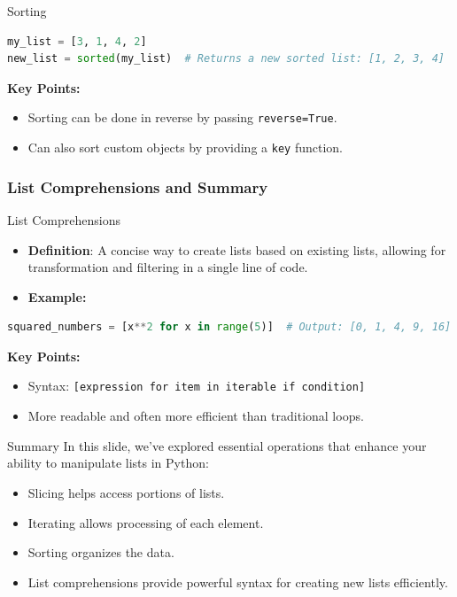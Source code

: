 \documentclass{beamer}
\begin{document}
\begin{frame}[fragile]
\begin{block}{Sorting}
        \begin{lstlisting}[language=Python]
my_list = [3, 1, 4, 2]
new_list = sorted(my_list)  # Returns a new sorted list: [1, 2, 3, 4]
        \end{lstlisting}

        \textbf{Key Points:}
        \begin{itemize}
            \item Sorting can be done in reverse by passing \texttt{reverse=True}.
            \item Can also sort custom objects by providing a \texttt{key} function.
        \end{itemize}
    \end{block}
\end{frame}

\begin{frame}[fragile]
    \frametitle{List Comprehensions and Summary}

    \begin{block}{List Comprehensions}
        \begin{itemize}
            \item \textbf{Definition}: A concise way to create lists based on existing lists, allowing for transformation and filtering in a single line of code.
            \item \textbf{Example:}
        \end{itemize}
        
        \begin{lstlisting}[language=Python]
squared_numbers = [x**2 for x in range(5)]  # Output: [0, 1, 4, 9, 16]
        \end{lstlisting}

        \textbf{Key Points:}
        \begin{itemize}
            \item Syntax: \texttt{[expression for item in iterable if condition]}
            \item More readable and often more efficient than traditional loops.
        \end{itemize}
    \end{block}

    \begin{block}{Summary}
        In this slide, we've explored essential operations that enhance your ability to manipulate lists in Python:
        \begin{itemize}
            \item Slicing helps access portions of lists.
            \item Iterating allows processing of each element.
            \item Sorting organizes the data.
            \item List comprehensions provide powerful syntax for creating new lists efficiently.
        \end{itemize}
    \end{block}
\end{frame}
\end{document}
